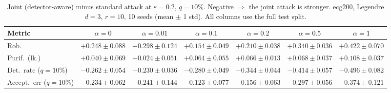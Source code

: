 \begin{table}[htbp]
  \centering
  \small
  \begin{tabular}{@{}lcccccc@{}}
    \toprule
    Metric & $\alpha{=}0$ & $\alpha{=}0.01$ & $\alpha{=}0.1$ & $\alpha{=}0.2$ & $\alpha{=}0.5$ & $\alpha{=}1$ \\
    \midrule
    Rob. & $+0.248 \pm 0.088$ & $+0.298 \pm 0.124$ & $+0.154 \pm 0.049$ & $+0.210 \pm 0.038$ & $+0.340 \pm 0.036$ & $+0.422 \pm 0.070$ \\
    Purif.\ (lk.) & $+0.040 \pm 0.069$ & $+0.024 \pm 0.051$ & $+0.064 \pm 0.055$ & $+0.066 \pm 0.013$ & $+0.068 \pm 0.037$ & $+0.108 \pm 0.037$ \\
    Det.\ rate ($q{=}10\%$) & $-0.262 \pm 0.054$ & $-0.230 \pm 0.036$ & $-0.280 \pm 0.049$ & $-0.344 \pm 0.044$ & $-0.414 \pm 0.057$ & $-0.496 \pm 0.082$ \\
    Accept.\ err ($q{=}10\%$) & $-0.234 \pm 0.062$ & $-0.241 \pm 0.144$ & $-0.123 \pm 0.077$ & $-0.156 \pm 0.063$ & $-0.297 \pm 0.056$ & $-0.374 \pm 0.121$ \\
    \bottomrule
  \end{tabular}
  \caption{Joint (detector-aware) minus standard attack at $\varepsilon=0.2$, $q{=}10\%$. Negative $\Rightarrow$ the joint attack is stronger. ecg200, Legendre $d{=}3$, $r{=}10$, 10 seeds (mean $\pm$ 1 std). All columns use the full test split.}
  \label{tab:ecg200_joint_r10_eps0.2}
\end{table}
